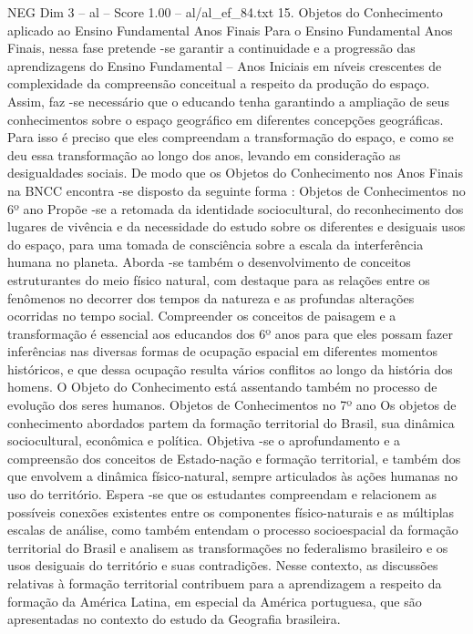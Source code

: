 \begin{textsample}{NEG Dim 3 – al – Score 1.00 – al/al\_ef\_84.txt}  \label{ex:f3_neg_080}
15.
Objetos do Conhecimento aplicado ao Ensino Fundamental Anos Finais Para o Ensino Fundamental Anos Finais, nessa fase pretende -se garantir a continuidade e a progressão das aprendizagens do Ensino Fundamental – Anos Iniciais em níveis crescentes de complexidade da compreensão conceitual a respeito da produção do espaço.
Assim, faz -se necessário que o educando tenha garantindo a ampliação de seus conhecimentos sobre o espaço geográfico em diferentes concepções geográficas.
Para isso é preciso que eles compreendam a transformação do espaço, e como se deu essa transformação ao longo dos anos, levando em consideração as desigualdades sociais.
De modo que os Objetos do Conhecimento nos Anos Finais na BNCC encontra -se disposto da seguinte forma : Objetos de Conhecimentos no 6º ano Propõe -se a retomada da identidade sociocultural, do reconhecimento dos lugares de vivência e da necessidade do estudo sobre os diferentes e desiguais usos do espaço, para uma tomada de consciência sobre a escala da interferência humana no planeta.
Aborda -se também o desenvolvimento de conceitos estruturantes do meio físico natural, com destaque para as relações entre os fenômenos no decorrer dos tempos da natureza e as profundas alterações ocorridas no tempo social.
Compreender os conceitos de paisagem e a transformação é essencial aos educandos dos 6º anos para que eles possam fazer inferências nas diversas formas de ocupação espacial em diferentes momentos históricos, e que dessa ocupação resulta vários conflitos ao longo da história dos homens.
O Objeto do Conhecimento está assentando também no processo de evolução dos seres humanos.
Objetos de Conhecimentos no 7º ano Os objetos de conhecimento abordados partem da formação territorial do Brasil, sua dinâmica sociocultural, econômica e política.
Objetiva -se o aprofundamento e a compreensão dos conceitos de Estado-nação e formação territorial, e também dos que envolvem a dinâmica físico-natural, sempre articulados às ações humanas no uso do território.
Espera -se que os estudantes compreendam e relacionem as possíveis conexões existentes entre os componentes físico-naturais e as múltiplas escalas de análise, como também entendam o processo socioespacial da formação territorial do Brasil e analisem as transformações no federalismo brasileiro e os usos desiguais do território e suas contradições.
Nesse contexto, as discussões relativas à formação territorial contribuem para a aprendizagem a respeito da formação da América Latina, em especial da América portuguesa, que são apresentadas no contexto do estudo da Geografia brasileira.

\end{textsample}
